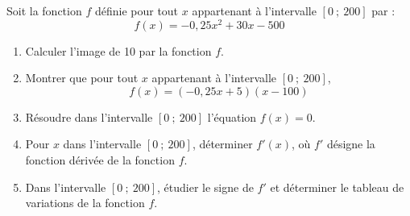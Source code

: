 Soit la fonction $f$ définie pour tout $x$ appartenant à l'intervalle $[0~;~200]$ par :
\[ f(x)=-0{,}25x^{2}+30x-500 \]

\begin{enumerate}
	\item Calculer l'image de 10 par la fonction $f$.
	\item Montrer que pour tout $x$ appartenant à l'intervalle $[0~;~200]$,
	\[ f(x)=(-0{,}25x+5)(x-100) \]
	\item Résoudre dans l'intervalle $[0~;~200]$ l'équation $f(x)=0$.
	\item Pour $x$ dans l'intervalle $[0~;~200]$, déterminer $f'(x)$, où $f'$ désigne la fonction dérivée de la fonction $f$.
	\item Dans l'intervalle $[0~;~200]$, étudier le signe de $f'$ et déterminer le tableau de variations de la fonction $f$.
\end{enumerate}
